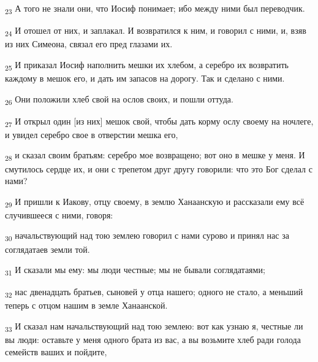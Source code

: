 \begin{tcolorbox}
\textsubscript{23} А того не знали они, что Иосиф понимает; ибо между ними был переводчик.
\end{tcolorbox}
\begin{tcolorbox}
\textsubscript{24} И отошел от них, и заплакал. И возвратился к ним, и говорил с ними, и, взяв из них Симеона, связал его пред глазами их.
\end{tcolorbox}
\begin{tcolorbox}
\textsubscript{25} И приказал Иосиф наполнить мешки их хлебом, а серебро их возвратить каждому в мешок его, и дать им запасов на дорогу. Так и сделано с ними.
\end{tcolorbox}
\begin{tcolorbox}
\textsubscript{26} Они положили хлеб свой на ослов своих, и пошли оттуда.
\end{tcolorbox}
\begin{tcolorbox}
\textsubscript{27} И открыл один [из них] мешок свой, чтобы дать корму ослу своему на ночлеге, и увидел серебро свое в отверстии мешка его,
\end{tcolorbox}
\begin{tcolorbox}
\textsubscript{28} и сказал своим братьям: серебро мое возвращено; вот оно в мешке у меня. И смутилось сердце их, и они с трепетом друг другу говорили: что это Бог сделал с нами?
\end{tcolorbox}
\begin{tcolorbox}
\textsubscript{29} И пришли к Иакову, отцу своему, в землю Ханаанскую и рассказали ему всё случившееся с ними, говоря:
\end{tcolorbox}
\begin{tcolorbox}
\textsubscript{30} начальствующий над тою землею говорил с нами сурово и принял нас за соглядатаев земли той.
\end{tcolorbox}
\begin{tcolorbox}
\textsubscript{31} И сказали мы ему: мы люди честные; мы не бывали соглядатаями;
\end{tcolorbox}
\begin{tcolorbox}
\textsubscript{32} нас двенадцать братьев, сыновей у отца нашего; одного не стало, а меньший теперь с отцом нашим в земле Ханаанской.
\end{tcolorbox}
\begin{tcolorbox}
\textsubscript{33} И сказал нам начальствующий над тою землею: вот как узнаю я, честные ли вы люди: оставьте у меня одного брата из вас, а вы возьмите хлеб ради голода семейств ваших и пойдите,
\end{tcolorbox}
